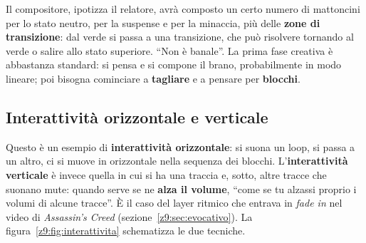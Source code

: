 Il compositore, ipotizza il relatore, avrà composto un certo numero di mattoncini
per lo stato neutro, per la suspense e per la minaccia, più delle \textbf{zone di
transizione}: dal verde si passa a una transizione, che può risolvere tornando al
verde o salire allo stato superiore. ``Non è banale''. La prima fase creativa è
abbastanza standard: si pensa e si compone il brano, probabilmente in modo
lineare; poi bisogna cominciare a \textbf{tagliare} e a pensare per
\textbf{blocchi}.

\subsection{Interattività orizzontale e verticale}

Questo è un esempio di \textbf{interattività orizzontale}: si suona un loop, si
passa a un altro, ci si muove in orizzontale nella sequenza dei blocchi.
L'\textbf{interattività verticale} è invece quella in cui si ha una traccia e,
sotto, altre tracce che suonano mute: quando serve se ne \textbf{alza il volume},
``come se tu alzassi proprio i volumi di alcune tracce''. È il caso del layer
ritmico che entrava in \emph{fade in} nel video di \emph{Assassin's Creed}
(sezione~\ref{z9:sec:evocativo}). La figura~\ref{z9:fig:interattivita}
schematizza le due tecniche.

